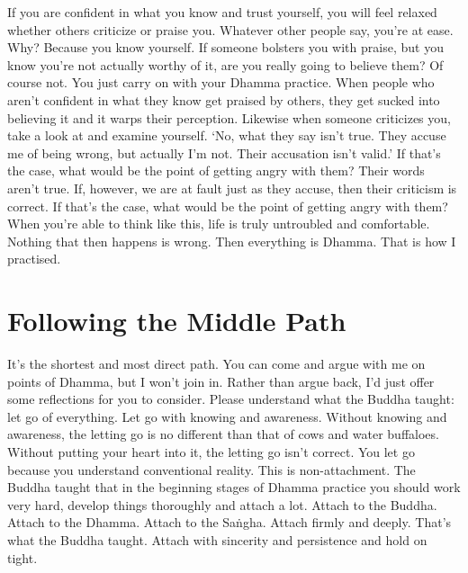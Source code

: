 If you are confident in what you know and trust yourself, you will feel relaxed whether others criticize or praise you. Whatever other people say, you're at ease. Why? Because you know yourself. If someone bolsters you with praise, but you know you're not actually worthy of it, are you really going to believe them? Of course not. You just carry on with your Dhamma practice. When people who aren't confident in what they know get praised by others, they get sucked into believing it and it warps their perception. Likewise when someone criticizes you, take a look at and examine yourself. `No, what they say isn't true. They accuse me of being wrong, but actually I'm not. Their accusation isn't valid.' If that's the case, what would be the point of getting angry with them? Their words aren't true. If, however, we are at fault just as they accuse, then their criticism is correct. If that's the case, what would be the point of getting angry with them? When you're able to think like this, life is truly untroubled and comfortable. Nothing that then happens is wrong. Then everything is Dhamma. That is how I practised.

\section{Following the Middle Path}

It's the shortest and most direct path. You can come and argue with me on points of Dhamma, but I won't join in. Rather than argue back, I'd just offer some reflections for you to consider. Please understand what the Buddha taught: let go of everything. Let go with knowing and awareness. Without knowing and awareness, the letting go is no different than that of cows and water buffaloes. Without putting your heart into it, the letting go isn't correct. You let go because you understand conventional reality. This is non-attachment. The Buddha taught that in the beginning stages of Dhamma practice you should work very hard, develop things thoroughly and attach a lot. Attach to the Buddha. Attach to the Dhamma. Attach to the Sa\.ngha. Attach firmly and deeply. That's what the Buddha taught. Attach with sincerity and persistence and hold on tight.

